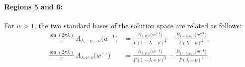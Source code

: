 \documentclass[12pt]{article}
\makeatletter
\newcommand*{\wideboxed}[1]{\setlength{\fboxsep}{1ex}%
  \fbox{\m@th$\displaystyle#1$}}
\newcommand*{\bra}[1]{\langle{#1}|}
\newcommand*{\ket}[1]{|{#1}\rangle}
\DeclareMathOperator{\Tr}{Tr}
\newcommand{\IN}{\text{in}}
\newcommand{\OUT}{\text{out}}
\makeatother
\begin{document}
\paragraph{Regions 5 and 6:} For $w>1$, the two standard bases of the solution space are related as follows:
\begin{equation}
\begin{aligned} \label{ABtrans56}
\frac{\sin(2\pi\lambda)}{\pi}\,A_{\lambda,-\nu,-\nu}\big(w^{-1}\big)
&=\frac{B_{\lambda,\nu,\nu}\big(w^{-1}\big)}{\Gamma(1-\lambda-\nu)^2}
-\frac{B_{1-\lambda,\nu,\nu}\big(w^{-1}\big)}{\Gamma(\lambda-\nu)^2},
\\[3pt]
\frac{\sin(2\pi\lambda)}{\pi}\,A_{\lambda,\nu,\nu}\big(w^{-1}\big)
&=\frac{B_{\lambda,\nu,\nu}\big(w^{-1}\big)}{\Gamma(1-\lambda+\nu)^2}
-\frac{B_{1-\lambda,\nu,\nu}\big(w^{-1}\big)}{\Gamma(\lambda+\nu)^2}.
\end{aligned}
\end{equation}
\end{document}
